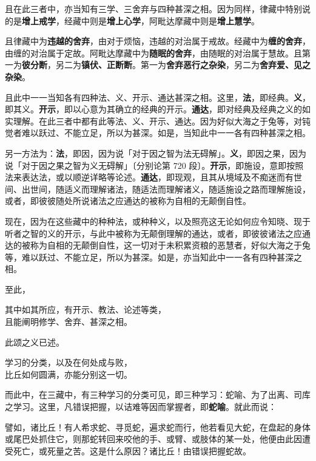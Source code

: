 且在此三者中，亦当知有三学、三舍弃与四种甚深之相。因为同样，律藏中特别说的是\textbf{增上戒学}，经藏中则是\textbf{增上心学}，阿毗达摩藏中则是\textbf{增上慧学}。

且律藏中为\textbf{违越的舍弃}，由对于烦恼，违越的对治属于戒故。经藏中为\textbf{缠的舍弃}，由缠的对治属于定故。阿毗达摩藏中为\textbf{随眠的舍弃}，由随眠的对治属于慧故。且第一为\textbf{彼分断}，另二为\textbf{镇伏、正断断}。第一为\textbf{舍弃恶行之杂染}，另二为\textbf{舍弃爱、见之杂染}。

且此中一一当知各有四种法、义、开示、通达甚深之相。这里，\textbf{法}，即经典。\textbf{义}，即其义。\textbf{开示}，即以心意为其确立的经典的开示。\textbf{通达}，即对经典及经典之义的如实理解。在此三者中都有此等法、义、开示、通达。因为好似大海之于兔等，对钝觉者难以跃过、不能立足，所以为甚深。如是，当知此中一一各有四种甚深之相。

另一方法为：\textbf{法}，即因，因为说「对于因之智为法无碍解」。\textbf{义}，即因之果，因为说「对于因之果之智为义无碍解」{\bluefootnotesize 〔分别论第 720 段〕}。\textbf{开示}，即施设，意即按照法来表达法，或以顺逆详略等论述。\textbf{通达}，即现观，且其从境域及不痴迷而有世间、出世间，随适义而理解诸法，随适法而理解诸义，随适施设之路而理解施设，或者，即彼彼随处所说诸法之应通达的被称为自相的无颠倒自性。

现在，因为在这些藏中的种种法，或种种义，以及照亮这无论如何应令知晓、现于听者之智的义的开示，与此中被称为无颠倒理解的通达，或者，即彼彼诸法之应通达的被称为自相的无颠倒自性，这一切对于未积累资粮的恶慧者，好似大海之于兔等，难以跃过、不能立足，所以为甚深。如是，亦当知此中一一各有四种甚深之相。

至此，

\begin{quoting}其中如其所应，有开示、教法、论述等类，\\且能阐明修学、舍弃、甚深之相。\end{quoting}

此颂之义已述。

\begin{quoting}学习的分类，以及在何处成与败，\\比丘如何圆满，亦能分别这一切。\end{quoting}

而此中，在三藏中，有三种学习的分类可见，即三种学习：蛇喻、为了出离、司库之学习。这里，凡错误把握，以诘难等因而掌握者，即\textbf{蛇喻}。就此而说：

\begin{quoting}譬如，诸比丘！有人希求蛇、寻觅蛇，遍求蛇而行，他若看见大蛇，在盘起的身体或尾巴处抓住它，则那蛇转回来咬他的手、或臂、或肢体的某一处，他便由此因遭受死亡，或死量之苦。这是什么原因？诸比丘！由错误把握蛇故。\end{quoting}

